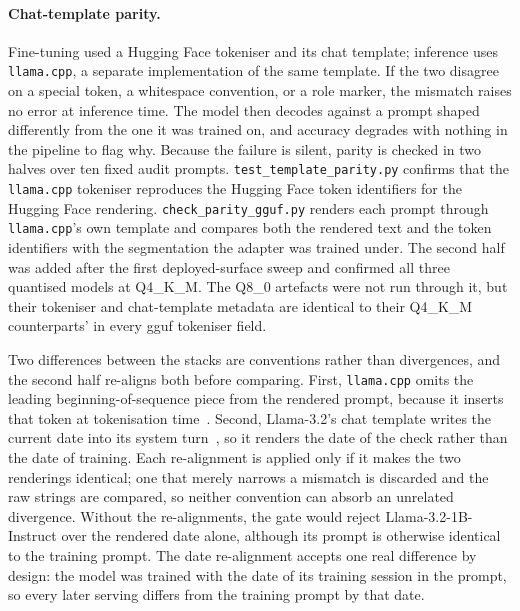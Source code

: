 \paragraph{Chat-template parity.} Fine-tuning used a Hugging Face tokeniser and its chat template;
inference uses \texttt{llama.cpp}, a separate implementation of the same template. If the two
disagree on a special token, a whitespace convention, or a role marker, the mismatch raises no error
at inference time. The model then decodes against a prompt shaped differently from the one it was
trained on, and accuracy degrades with nothing in the pipeline to flag why. Because the failure is silent,
parity is checked in two halves over ten fixed audit prompts. \texttt{test\_template\_parity.py}
confirms that the \texttt{llama.cpp} tokeniser reproduces the Hugging Face token identifiers for the
Hugging Face rendering. \texttt{check\_parity\_gguf.py} renders each prompt through
\texttt{llama.cpp}'s own template and compares both the rendered text and the token identifiers
with the segmentation the adapter was trained under. The second half was added after the first
deployed-surface sweep and confirmed all three quantised models at Q4\_K\_M. The Q8\_0 artefacts were
not run through it, but their tokeniser and chat-template metadata are identical to their Q4\_K\_M
counterparts' in every \gls{gguf} tokeniser field.

Two differences between the stacks are conventions rather than divergences, and the second half
re-aligns both before comparing. First, \texttt{llama.cpp} omits the leading beginning-of-sequence
piece from the rendered prompt, because it inserts that token at tokenisation
time~\cite{llamacppchat}. Second, Llama-3.2's chat template writes the current date into its system
turn~\cite{llama32card}, so it renders the date of the check rather than the date of training. Each re-alignment is applied only if
it makes the two renderings identical; one that merely narrows a mismatch is discarded and the raw
strings are compared, so neither convention can absorb an unrelated divergence. Without the
re-alignments, the gate would reject Llama-3.2-1B-Instruct over the rendered date alone, although its
prompt is otherwise identical to the training prompt. The date re-alignment accepts one real
difference by design: the model was trained with the date of its training session in the prompt, so
every later serving differs from the training prompt by that date.

